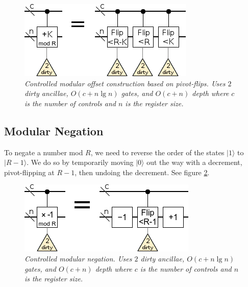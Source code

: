 \documentclass[twocolumn]{article}
\begin{document}
\begin{figure}
  \centering
  \includegraphics[width=\linewidth]{assets/controlled-modular-offset.png}
  \caption{\em
    Controlled modular offset construction based on pivot-flips.
    Uses $2$ dirty ancillae, $O(c + n \lg n)$ gates, and $O(c + n)$ depth where $c$ is the number of controls and $n$ is the register size.
  }
  \label{fig:controlled-modular-offset}
\end{figure}


\subsection{Modular Negation}

To negate a number mod $R$, we need to reverse the order of the states $|1\rangle$ to $|R-1\rangle$.
We do so by temporarily moving $|0\rangle$ out the way with a decrement, pivot-flipping at $R-1$, then undoing the decrement.
See figure \ref{fig:negate-mod}.

\begin{figure}
  \centering
  \includegraphics[width=\linewidth]{assets/negate-mod.png}
  \caption{\em
    Controlled modular negation.
    Uses $2$ dirty ancillae, $O(c + n \lg n)$ gates, and $O(c + n)$ depth where $c$ is the number of controls and $n$ is the register size.
  }
  \label{fig:negate-mod}
\end{figure}
\end{document}
